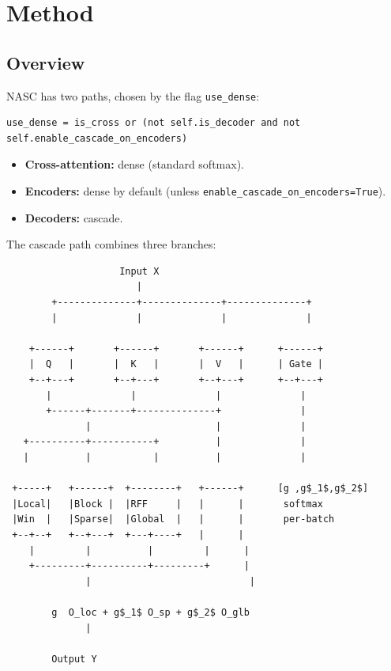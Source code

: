 
\section{Method}

\subsection{Overview}

NASC has two paths, chosen by the flag \texttt{use\_dense}:

\begin{lstlisting}
use_dense = is_cross or (not self.is_decoder and not self.enable_cascade_on_encoders)
\end{lstlisting}

\begin{itemize}
\item \textbf{Cross-attention:} dense (standard softmax).
\item \textbf{Encoders:} dense by default (unless \texttt{enable\_cascade\_on\_encoders=True}).
\item \textbf{Decoders:} cascade.

\end{itemize}
The cascade path combines three branches:

\begin{lstlisting}
                    Input X
                       |
        +--------------+--------------+--------------+
        |              |              |              |
                                                      
    +------+       +------+       +------+      +------+
    |  Q   |       |  K   |       |  V   |      | Gate |
    +--+---+       +--+---+       +--+---+      +--+---+
       |              |              |              |
       +------+-------+--------------+              |
              |                      |              |
   +----------+-----------+          |              |
   |          |           |          |              |
                                                     
 +-----+   +------+  +--------+   +------+      [g ,g$_1$,g$_2$]
 |Local|   |Block |  |RFF     |   |      |       softmax
 |Win  |   |Sparse|  |Global  |   |      |       per-batch
 +--+--+   +--+---+  +---+----+   |      |
    |         |          |         |      |
    +---------+----------+---------+      |
              |                            |
                                            
        g  O_loc + g$_1$ O_sp + g$_2$ O_glb
              |
               
        Output Y
\end{lstlisting}

